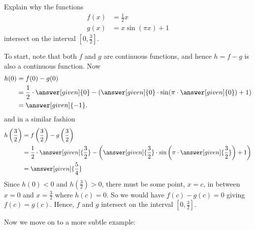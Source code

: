 \documentclass{ximera}
\begin{document}
\begin{example} 
  Explain why the functions
  \begin{align*}
    f(x) &= \frac{1}{2}x\\
    g(x) &= x\sin \left(\pi x\right)+1
  \end{align*}
  intersect on the interval $\left[0,\frac{3}{2}\right]$.

  To start, note that both $f$ and $g$ are continuous functions, and
  hence $h = f-g$ is also a continuous function. Now
  \begin{align*}
    h(0) &= f(0) - g(0) \\
    &= \frac{1}{2}\cdot\answer[given]{0} - (\answer[given]{0}\cdot \sin(\pi\cdot\answer[given]{0})+1)\\
    &= \answer[given]{-1}.
  \end{align*}
  and in a similar fashion
   \begin{align*}
    h\left(\frac{3}{2}\right) &= f\left(\frac{3}{2}\right) - g\left(\frac{3}{2}\right) \\
    &= \frac{1}{2}\cdot\answer[given]{\frac{3}{2}} - \left(\answer[given]{\frac{3}{2}}\cdot \sin\left(\pi\cdot\answer[given]{\frac{3}{2}}\right)+1\right)\\
    &= \answer[given]{\frac{5}{4}}\\
  \end{align*}
   Since $h(0)<0$ and $h\left(\frac{3}{2}\right)>0$, there must be some point, $x=c$, in between $x=0$ and $x=\frac{3}{2}$ where $h(c)=0$. So we would have $f(c)-g(c)=0$ giving $f(c)=g(c)$. Hence, $f$ and $g$ intersect on the interval $\left[0,\frac{3}{2}\right]$.
\end{example}




Now we move on to a more subtle example:
\end{document}
